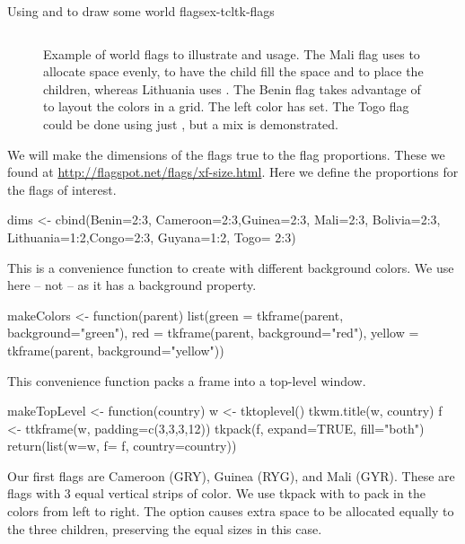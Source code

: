 \begin{example}{Using  and  to draw some world flags}{ex-tcltk-flags}
\begin{figure}
\begin{tabular}{cc}
  \end{tabular}
  \caption{Example of world flags to illustrate  and  usage. The Mali flag uses  to allocate space evenly,  to have the child fill the space and  to place the children, whereas Lithuania uses . The Benin flag takes advantage of  to layout the colors in a grid. The left color has  set. The Togo flag could be done using just , but a mix is demonstrated.}
  \label{fig:tcltk-flags}
\end{figure}



We will make the dimensions of the flags true to the flag
proportions. These we found at
\url{http://flagspot.net/flags/xf-size.html}. Here we define the
proportions for the flags of interest.
\begin{Schunk}
\begin{Sinput}
 dims <- cbind(Benin=2:3, Cameroon=2:3,Guinea=2:3, Mali=2:3,
               Bolivia=2:3, Lithuania=1:2,Congo=2:3, Guyana=1:2,
               Togo= 2:3)
\end{Sinput}
\end{Schunk}

This is a convenience function to create  with different background colors. We use  here -- not  -- as it has a background property.
\begin{Schunk}
\begin{Sinput}
 makeColors <- function(parent)
   list(green  = tkframe(parent, background="green"),
        red    = tkframe(parent, background="red"),
        yellow = tkframe(parent, background="yellow"))
\end{Sinput}
\end{Schunk}

This convenience function packs a frame into a top-level window.
\begin{Schunk}
\begin{Sinput}
 makeTopLevel <- function(country) {
   w <- tktoplevel()
   tkwm.title(w, country)
   f <- ttkframe(w, padding=c(3,3,3,12))
   tkpack(f, expand=TRUE, fill="both")
   return(list(w=w, f= f, country=country))
 }
\end{Sinput}
\end{Schunk}

Our first flags are Cameroon (GRY), Guinea (RYG), and Mali
(GYR). These are flags with 3 equal vertical strips of color. We use
tkpack with  to pack in the colors from left to
right. The  option causes extra space to be
allocated equally to the three children, preserving the equal sizes in
this case.


\end{example}
